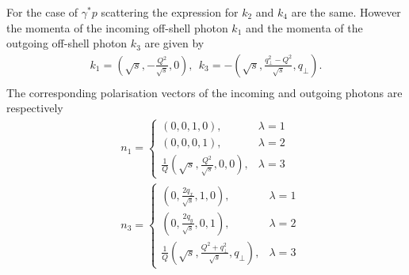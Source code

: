 \documentclass[10 pt]{article}
\begin{document}
For the case of $\gamma^{*} p$ scattering the expression for $k_2$ and $k_4$ are the same. However the momenta of the incoming off-shell photon $k_1$ and the momenta of the outgoing off-shell photon $k_3$ are given by
\begin{align}
\label{eq:gammap_kinematics}
k_1=\left(\!\sqrt{s},-\frac{Q^2}{\sqrt{s}} ,0\right),\  \ k_3=-\left(\!\sqrt{s},\frac{ q_\perp^2 -Q^2}{\sqrt{s}} , q_\perp \right)\!.\\
\end{align}
The corresponding polarisation vectors of the incoming and outgoing photons are respectively
\begin{align}
&n_1=
    \begin{cases}
      \left(0,0,1,0\right), & \lambda=1 \\
      \left(0,0,0,1\right), & \lambda=2 \\
      \frac{1}{Q} \left( \sqrt{s}, \frac{Q^2}{\sqrt{s}}, 0, 0 \right), & \lambda = 3
    \end{cases} \\
 &n_3=
    \begin{cases}
      \left(0,\frac{2 q_x}{\sqrt{s}},1,0\right), & \lambda=1 \\
      \left(0,\frac{2 q_y}{\sqrt{s}},0,1\right), & \lambda=2 \\
      \frac{1}{Q} \left(\sqrt{s}, \frac{Q^2+q_\perp^2}{\sqrt{s}}, q_\perp \right), & \lambda = 3
    \end{cases}   
\end{align}
\end{document}
